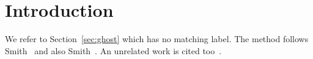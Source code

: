 \documentclass[twocolumn]{article}
\begin{document}
\section{Introduction}
We refer to Section~\ref{sec:ghost} which has no matching label.
The method follows Smith~\cite{smith2020} and also Smith~\cite{smith2020}.
An unrelated work is cited too~\cite{ghost2022}.



\end{document}
